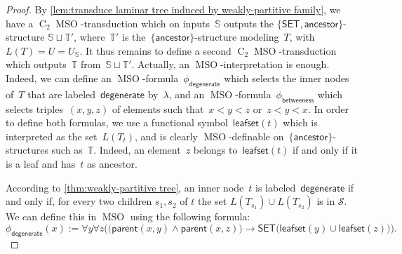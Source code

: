 \documentclass{lmcs} %
\newcommand{\MSO}{\ensuremath{\operatorname{MSO}}\xspace}
\newcommand{\CMSO}[1][]{\ensuremath{\C[#1]{\!\!}\MSO}\xspace}
\newcommand{\C}[1][]{\ensuremath{\operatorname{C}_{#1}}\xspace}
\newcommand{\ancestor}{\mathsf{ancestor}}
\newcommand{\betweeness}{\mathsf{betweeness}}
\newcommand{\parent}{\ensuremath{\mathsf{parent}}\xspace}
\newcommand{\SET}{\ensuremath{\mathsf{SET}}\xspace}
\newcommand{\leafset}{\ensuremath{\mathsf{leafset}}\xspace}
\newcommand\DEGENERATE{\ensuremath{\mathsf{degenerate}}\xspace}
\newcommand{\ifof}{if and only if\xspace}
\renewcommand{\implies}{\rightarrow}
\begin{document}
\begin{proof}
    By \autoref{lem:transduce laminar tree induced by weakly-partitive family},
    we have a \CMSO[2]-transduction
    which on inputs~$\mathbb{S}$ outputs the $\{\SET,\ancestor\}$-structure $\mathbb{S}\sqcup\mathbb{T'}$,
    where~$\mathbb{T'}$ is the~$\{\ancestor\}$-structure modeling~$T$, with $L(T)=U=U_{\mathbb{S}}$.
    It thus remains to define a second \CMSO[2]-transduction
    which outputs~$\mathbb{T}$ from~$\mathbb{S}\sqcup\mathbb{T'}$.
    Actually, an \MSO-interpretation is enough.
    Indeed, we can define
    an \MSO-formula~$\phi_{\DEGENERATE}$ which selects the inner nodes of~$T$ that are labeled~$\DEGENERATE$ by~$\lambda$,
    and an \MSO-formula~$\phi_{\betweeness}$ which selects triples~$(x,y,z)$ of elements such that~$x<y<z$ or~$z<y<x$.
    In order to define both formulas,
    we use a functional symbol~$\leafset(t)$
    which is interpreted as the set~$L(T_t)$,
    and is clearly \MSO-definable on~$\{\ancestor\}$-structures such as~$\mathbb{T}$.
    Indeed, an element~$z$ belongs to~$\leafset(t)$ \ifof
    it is a leaf and has~$t$ as ancestor.

    According to \autoref{thm:weakly-partitive tree},
    an inner node~$t$ is labeled~$\DEGENERATE$
    \ifof,
    for every two children $s_1,s_2$ of $t$ the set $L(T_{s_1})\cup L(T_{s_2})$ is in $\mathcal{S}$. We can define this in \MSO using the following formula:
        $$\phi_{\DEGENERATE}(x):=\forall y \forall z\Big(\big(\parent(x,y)\land \parent(x,z)\big)\implies \SET\big(\leafset(y)\cup \leafset(z)\big)\Big).$$



\end{proof}
\end{document}

